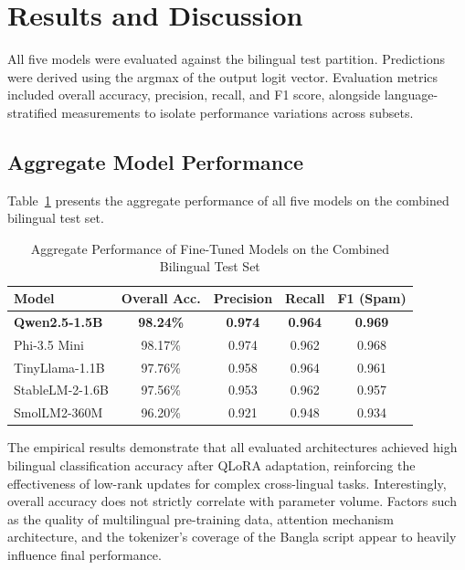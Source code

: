 \documentclass[journal]{IEEEtran}
\begin{document}
\section{Results and Discussion}

All five models were evaluated against the bilingual test partition. Predictions were derived using the argmax of the output logit vector. Evaluation metrics included overall accuracy, precision, recall, and F1 score, alongside language-stratified measurements to isolate performance variations across subsets.

\subsection{Aggregate Model Performance}

Table~\ref{tab:aggregate_results} presents the aggregate performance of all five models on the combined bilingual test set.

\begin{table}[htbp]
\caption{Aggregate Performance of Fine-Tuned Models on the Combined Bilingual Test Set}
\label{tab:aggregate_results}
\centering
\begin{tabular}{lcccc}
\toprule
\textbf{Model} & \textbf{Overall Acc.} & \textbf{Precision} & \textbf{Recall} & \textbf{F1 (Spam)} \\
\midrule
\rowcolor{gray!20} \textbf{Qwen2.5-1.5B} & \textbf{98.24\%} & \textbf{0.974} & \textbf{0.964} & \textbf{0.969} \\
Phi-3.5 Mini & 98.17\% & 0.974 & 0.962 & 0.968 \\
TinyLlama-1.1B & 97.76\% & 0.958 & 0.964 & 0.961 \\
StableLM-2-1.6B & 97.56\% & 0.953 & 0.962 & 0.957 \\
SmolLM2-360M & 96.20\% & 0.921 & 0.948 & 0.934 \\
\bottomrule
\end{tabular}
\end{table}



The empirical results demonstrate that all evaluated architectures achieved high bilingual classification accuracy after QLoRA adaptation, reinforcing the effectiveness of low-rank updates for complex cross-lingual tasks. Interestingly, overall accuracy does not strictly correlate with parameter volume. Factors such as the quality of multilingual pre-training data, attention mechanism architecture, and the tokenizer's coverage of the Bangla script appear to heavily influence final performance.
\end{document}
